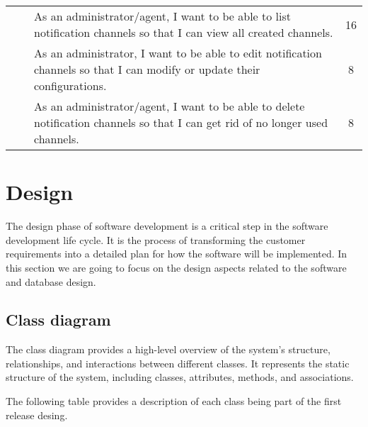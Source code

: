 \begin{longtable}{ | m{}  | m{} | m{} | c | }
    \cline{3-4}
                            &                                                     & As an administrator/agent, I want to be able to list notification channels so that I can view all created channels.                   & 16                  \\
    \cline{3-4}
                            &                                                     & As an administrator, I want to be able to edit notification channels so that I can modify or update their configurations.             & 8                   \\
    \cline{3-4}
                            &                                                     & As an administrator/agent, I want to be able to delete notification channels so that I can get rid of no longer used channels.        & 8                   \\
    \hline
\end{longtable}

\section{Design}
The design phase of software development is a critical step in the software development life cycle.
It is the process of transforming the customer requirements into a detailed plan for how the software
will be implemented. In this section we are going to focus on the design aspects related to the software
and database design.

\subsection{Class diagram}
The class diagram provides a high-level overview of the system's structure, relationships,
and interactions between different classes. It represents the static structure of the system,
including classes, attributes, methods, and associations.

\noindent The following table provides a description of each class being part of the first release desing.

